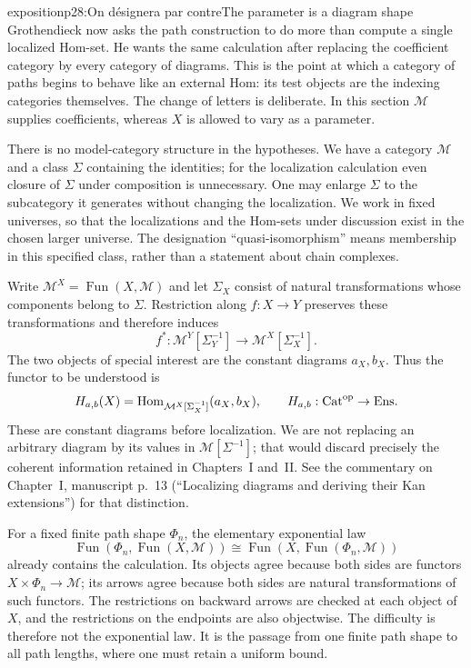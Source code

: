 \begin{dcomment}{exposition}{p28:On désignera par contre}{The parameter is a diagram shape}
Grothendieck now asks the path construction to do more than compute a single localized Hom-set. He wants the same calculation after replacing the coefficient category by every category of diagrams. This is the point at which a category of paths begins to behave like an external Hom: its test objects are the indexing categories themselves. The change of letters is deliberate. In this section $\mathcal M$ supplies coefficients, whereas $X$ is allowed to vary as a parameter.

There is no model-category structure in the hypotheses. We have a category $\mathcal M$ and a class $\Sigma$ containing the identities; for the localization calculation even closure of $\Sigma$ under composition is unnecessary. One may enlarge $\Sigma$ to the subcategory it generates without changing the localization. We work in fixed universes, so that the localizations and the Hom-sets under discussion exist in the chosen larger universe. The designation ``quasi-isomorphism'' means membership in this specified class, rather than a statement about chain complexes.

Write $\mathcal M^X=\operatorname{Fun}(X,\mathcal M)$ and let $\Sigma_X$ consist of natural transformations whose components belong to $\Sigma$. Restriction along $f:X\to Y$ preserves these transformations and therefore induces
\[
 f^*: \mathcal M^Y[\Sigma_Y^{-1}]
       \longrightarrow \mathcal M^X[\Sigma_X^{-1}].
\]
The two objects of special interest are the constant diagrams $a_X,b_X$. Thus the functor to be understood is
\[
 H_{a,b}(X)=\operatorname{Hom}_{\mathcal M^X[\Sigma_X^{-1}]}(a_X,b_X),
 \qquad H_{a,b}:\mathrm{Cat}^{\mathrm{op}}\to\mathrm{Ens}.
\]
These are constant diagrams before localization. We are not replacing an arbitrary diagram by its values in $\mathcal M[\Sigma^{-1}]$; that would discard precisely the coherent information retained in Chapters~I and~II. See the commentary on Chapter~I, manuscript p.~13 (``Localizing diagrams and deriving their Kan extensions'') for that distinction.

For a fixed finite path shape $\Phi_n$, the elementary exponential law
\[
 \operatorname{Fun}(\Phi_n,\operatorname{Fun}(X,\mathcal M))
 \cong\operatorname{Fun}(X,\operatorname{Fun}(\Phi_n,\mathcal M))
\]
already contains the calculation. Its objects agree because both sides are functors $X\times\Phi_n\to\mathcal M$; its arrows agree because both sides are natural transformations of such functors. The restrictions on backward arrows are checked at each object of $X$, and the restrictions on the endpoints are also objectwise. The difficulty is therefore not the exponential law. It is the passage from one finite path shape to all path lengths, where one must retain a uniform bound.
\end{dcomment}


